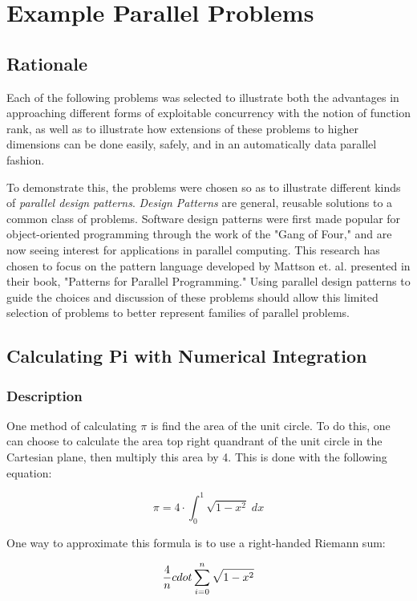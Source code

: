 \chapter{Example Parallel Problems}
\label{probs}

\section{Rationale}
Each of the following problems was selected to illustrate 
both the advantages in approaching different forms of exploitable concurrency with the notion of function rank, 
as well as to illustrate how extensions of these problems to higher dimensions can be done easily, safely, 
and in an automatically data parallel fashion.

To demonstrate this, the problems were chosen so as to illustrate different kinds of \textit{parallel design patterns}. 
\textit{Design Patterns} are general, reusable solutions to a common class of problems. %
Software design patterns were first made popular for object-oriented programming through the work of the "Gang of Four," %
and are now seeing interest for applications in parallel computing. %
This research has chosen to focus on the pattern language developed by Mattson et. al. 
presented in their book, "Patterns for Parallel Programming." %
Using parallel design patterns to guide the choices and discussion of these problems 
should allow this limited selection of problems to better represent families of parallel problems.

\section{Calculating Pi with Numerical Integration}
\subsection{Description}
One method of calculating $\pi$ is find the area of the unit circle. 
To do this, one can choose to calculate the area top right quandrant of the unit circle in the Cartesian plane, 
then multiply this area by 4. 
This is done with the following equation:

\[\pi = 4 \cdot \int_0^1 \sqrt{1 - x^2} \; dx\]

One way to approximate this formula is to use a right-handed Riemann sum:

\[\frac{4}{n} \\cdot \sum_{i=0}^n \sqrt{1 - x^2} \]

